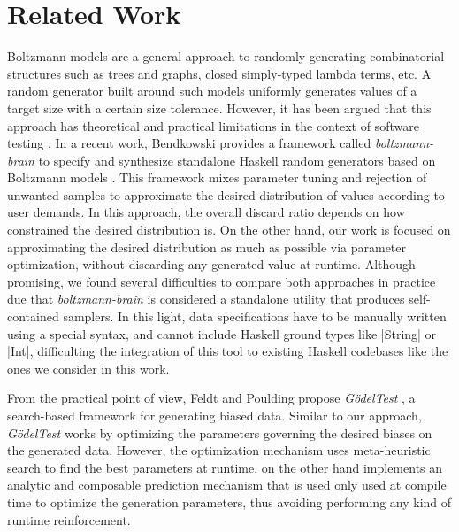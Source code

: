 \section{Related Work}


%
%
Boltzmann models \cite{Duchon2004} are a general approach to randomly generating
combinatorial structures such as trees and graphs, closed simply-typed lambda
terms, etc.
%
A random generator built around such models uniformly generates values of a
target size with a certain size tolerance.
%
However, it has been argued that this approach has theoretical and practical
limitations in the context of software testing \cite{feldt2013}.
%
In a recent work, Bendkowski provides a framework called \emph{boltzmann-brain}
to specify and synthesize standalone Haskell random generators based on
Boltzmann models \cite{bendkowski2018}.
%
This framework mixes parameter tuning and rejection of unwanted samples to
approximate the desired distribution of values according to user demands.
%
In this approach, the overall discard ratio depends on how constrained the
desired distribution is.
%
On the other hand, our work is focused on approximating the desired distribution
as much as possible via parameter optimization, without discarding any generated
value at runtime.
%
Although promising, we found several difficulties to compare both approaches in
practice due that \emph{boltzmann-brain} is considered a standalone utility that
produces self-contained samplers.
%
In this light, data specifications have to be manually written using a special
syntax, and cannot include Haskell ground types like |String| or |Int|,
difficulting the integration of this tool to existing Haskell codebases like the
ones we consider in this work.



%
%
From the practical point of view, Feldt and Poulding propose \emph{G\"odelTest}
\cite{feldt2013}, a search-based framework for generating biased data.
%
%
Similar to our approach, \emph{G\"odelTest} works by optimizing the parameters
governing the desired biases on the generated data.
%
However, the optimization mechanism uses meta-heuristic search to find the best
parameters at runtime.
%
\dragenp on the other hand implements an analytic and composable prediction
mechanism that is used only used at compile time to optimize the generation
parameters, thus avoiding performing any kind of runtime reinforcement.


